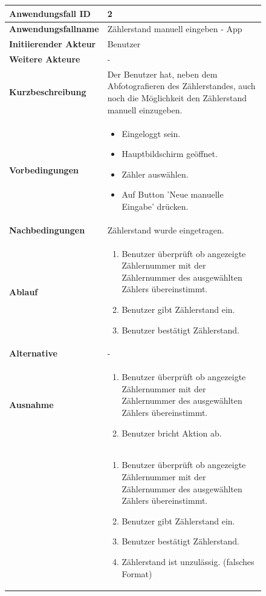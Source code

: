 \newpage

\begin{figure}[h]
	\centering
	\begin{tabularx}{\textwidth}{ X | X }
		\textbf{Anwendungsfall ID} & 2 \\ \hline
		\textbf{Anwendungsfallname} & Zählerstand manuell eingeben - App \\ \hline
		\textbf{Initiierender Akteur} & Benutzer \\ \hline
		\textbf{Weitere Akteure} & - \\ \hline
		\textbf{Kurzbeschreibung} & Der Benutzer hat, neben dem Abfotografieren des Zählerstandes, auch noch die Möglichkeit den Zählerstand manuell 									einzugeben.  \\ \hline
		\textbf{Vorbedingungen} & 
		\begin {itemize}
			\item Eingeloggt sein. 
			\item Hauptbildschirm geöffnet.
			\item Zähler auswählen.
			\item Auf Button 'Neue manuelle Eingabe' drücken.
		\end{itemize}\\ \hline
		\textbf{Nachbedingungen} & Zählerstand wurde eingetragen.  \\ \hline
		\textbf{Ablauf} &
		\begin{enumerate}
			\item Benutzer überprüft ob angezeigte Zählernummer mit der Zählernummer des ausgewählten Zählers übereinstimmt.
			\item Benutzer gibt Zählerstand ein.
			\item Benutzer bestätigt Zählerstand.
		\end{enumerate} \\ \hline
		\textbf{Alternative} & - \\ \hline
		\textbf{Ausnahme} &
		\begin{enumerate}
			\item Benutzer überprüft ob angezeigte Zählernummer mit der Zählernummer des ausgewählten Zählers übereinstimmt.
			\item Benutzer bricht Aktion ab.
		\end{enumerate}  \\  &
		\begin{enumerate}
			\item Benutzer überprüft ob angezeigte Zählernummer mit der Zählernummer des ausgewählten Zählers übereinstimmt.
			\item Benutzer gibt Zählerstand ein.
			\item Benutzer bestätigt Zählerstand.
			\item Zählerstand ist unzulässig. (falsches Format)


\end{enumerate}
\end{tabularx}
\end{figure}
